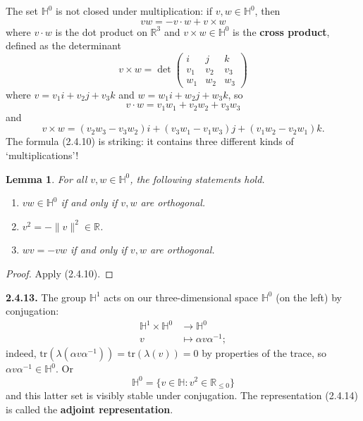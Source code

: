 \documentclass{article}
\newtheorem{lemma}[theorem]{Lemma}
\theoremstyle{definition}
\begin{document}
The set $\mathbb{H}^0$ is not closed under multiplication: if $v, w \in \mathbb{H}^0$, then
\begin{equation}
vw = -v \cdot w + v \times w \tag{2.4.10}
\end{equation}
where $v \cdot w$ is the dot product on $\mathbb{R}^3$ and $v \times w \in \mathbb{H}^0$ is the \textbf{cross product}, defined as the determinant
\begin{equation}
v \times w = \det \begin{pmatrix} i & j & k \\ v_1 & v_2 & v_3 \\ w_1 & w_2 & w_3 \end{pmatrix} \tag{2.4.11}
\end{equation}
where $v = v_1 i + v_2 j + v_3 k$ and $w = w_1 i + w_2 j + w_3 k$, so
$$v \cdot w = v_1 w_1 + v_2 w_2 + v_3 w_3$$
and
$$v \times w = (v_2 w_3 - v_3 w_2)i + (v_3 w_1 - v_1 w_3)j + (v_1 w_2 - v_2 w_1)k.$$
The formula (2.4.10) is striking: it contains three different kinds of `multiplications'!

\begin{lemma}
For all $v, w \in \mathbb{H}^0$, the following statements hold.
\begin{enumerate}[label=(\alph*)]
\item $vw \in \mathbb{H}^0$ if and only if $v, w$ are orthogonal.
\item $v^2 = -\|v\|^2 \in \mathbb{R}$.
\item $wv = -vw$ if and only if $v, w$ are orthogonal.
\end{enumerate}
\end{lemma}

\begin{proof}
Apply (2.4.10).
\end{proof}

\textbf{2.4.13.} The group $\mathbb{H}^1$ acts on our three-dimensional space $\mathbb{H}^0$ (on the left) by conjugation:
\begin{equation}
\begin{aligned}
\mathbb{H}^1 \times \mathbb{H}^0 &\to \mathbb{H}^0 \\
v &\mapsto \alpha v \alpha^{-1};
\end{aligned} \tag{2.4.14}
\end{equation}
indeed, $\mathrm{tr}(\lambda(\alpha v \alpha^{-1})) = \mathrm{tr}(\lambda(v)) = 0$ by properties of the trace, so $\alpha v \alpha^{-1} \in \mathbb{H}^0$. Or
$$\mathbb{H}^0 = \{v \in \mathbb{H} : v^2 \in \mathbb{R}_{\leq 0}\}$$
and this latter set is visibly stable under conjugation. The representation (2.4.14) is called the \textbf{adjoint representation}.
\end{document}
